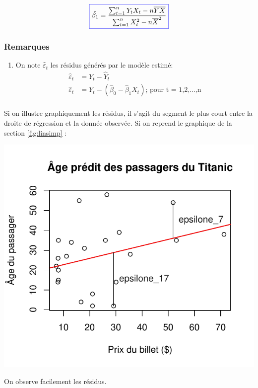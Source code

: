 \documentclass[11pt,french]{report}
\begin{document}
\begin{equation}
\label{eq:beta1}
\color{blue}
\boxed{\color{black}
\hat{\beta_1} = \frac{\sum_{t=1}^n Y_t X_t - n\overline{Y}\overline{X}}{\sum_{t=1}^n X_t^2 - n\overline{X}^2}
}
\end{equation}

\subsubsection*{Remarques}
\begin{enumerate}
\item On note $\hat{\varepsilon}_t$ les résidus générés par le modèle estimé:
\begin{align*}
\hat{\varepsilon}_t &= Y_t - \hat{Y}_t \\
\hat{\varepsilon}_t &= Y_t - (\hat{\beta}_0 - \hat{\beta}_1 X_t) \text{; pour t = 1,2,...,n} \\
\end{align*}
\end{enumerate}
Si on illustre graphiquement les résidus, il s'agit du segment le plus court entre la droite de régression et la donnée observée. Si on reprend le graphique de la section \ref{fig:linsimp} :

\includegraphics{notes_de_cours-007}

On observe facilement les résidus.

\newpage
\appendix
\end{document}
